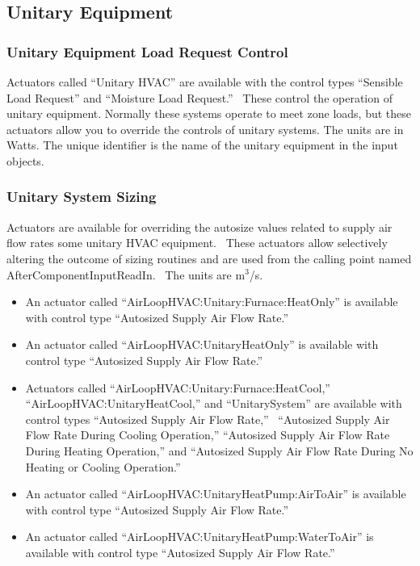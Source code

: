 \subsection{Unitary Equipment}\label{unitary-equipment}

\subsubsection{Unitary Equipment Load Request Control}\label{unitary-equipment-load-request-ctrl}

Actuators called ``Unitary HVAC'' are available with the control types ``Sensible Load Request'' and ``Moisture Load Request.''~ These control the operation of unitary equipment. Normally these systems operate to meet zone loads, but these actuators allow you to override the controls of unitary systems. The units are in Watts. The unique identifier is the name of the unitary equipment in the input objects.

\subsubsection{Unitary System Sizing}\label{unitary-system-sizing}

Actuators are available for overriding the autosize values related to supply air flow rates some unitary HVAC equipment.~ These actuators allow selectively altering the outcome of sizing routines and are used from the calling point named AfterComponentInputReadIn.~ The units are m\(^{3}\)/s.

\begin{itemize}
\item
  An actuator called ``AirLoopHVAC:Unitary:Furnace:HeatOnly'' is available with control type ``Autosized Supply Air Flow Rate.''
\item
  An actuator called ``AirLoopHVAC:UnitaryHeatOnly'' is available with control type ``Autosized Supply Air Flow Rate.''
\item
  Actuators called ``AirLoopHVAC:Unitary:Furnace:HeatCool,''  ``AirLoopHVAC:UnitaryHeatCool,'' and ``UnitarySystem'' are available with control types ``Autosized Supply Air Flow Rate,''~ ``Autosized Supply Air Flow Rate During Cooling Operation,'' ``Autosized Supply Air Flow Rate During Heating Operation,'' and ``Autosized Supply Air Flow Rate During No Heating or Cooling Operation.''
\item
  An actuator called ``AirLoopHVAC:UnitaryHeatPump:AirToAir'' is available with control type ``Autosized Supply Air Flow Rate.''
\item
  An actuator called ``AirLoopHVAC:UnitaryHeatPump:WaterToAir'' is available with control type ``Autosized Supply Air Flow Rate.''
\end{itemize}

